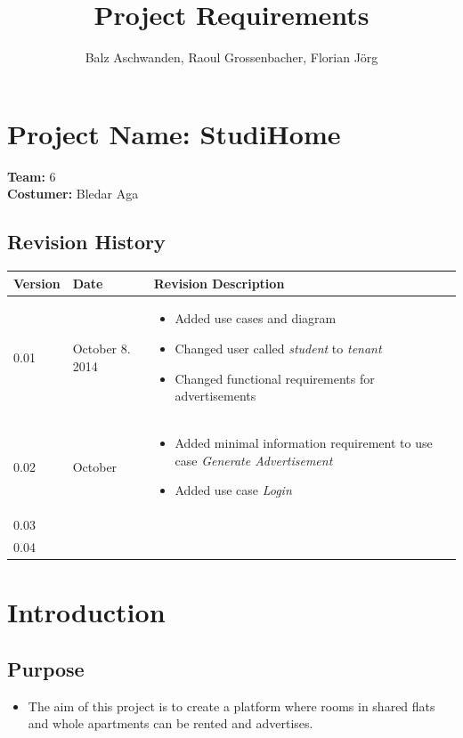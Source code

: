 \documentclass[a4paper,11pt]{article}
\title{Project Requirements}
\author{Balz Aschwanden, Raoul Grossenbacher, Florian Jörg}
\begin{document}
\maketitle
\section*{Project Name: StudiHome}

\textbf{Team:} 6 \\
\textbf{Costumer:} Bledar Aga \\

\subsection*{Revision History}
\begin{tabular}{|p{1.2cm}|p{3cm}|p{8cm}|} \hline
  Version & Date & Revision Description \\ \hline
  0.01 & October 8. 2014 &
  \begin{itemize}
  	\item Added use cases and diagram
  	\item Changed user called \textit{student} to \textit{tenant}
  	\item Changed functional requirements for advertisements
  \end{itemize} \\ \hline
  0.02 & October & 
  \begin{itemize}
  	\item Added minimal information requirement to use case \textit{Generate Advertisement}
  	\item Added use case \textit{Login}
  \end{itemize} \\ \hline
  0.03 & & \\ \hline
  0.04 & & \\ \hline
\end{tabular}

\section{Introduction}

\subsection*{Purpose}
\begin{itemize}
  \item The aim of this project is to create a platform where rooms in shared flats and whole apartments can be rented and advertises.
\end{itemize}
\end{document}
